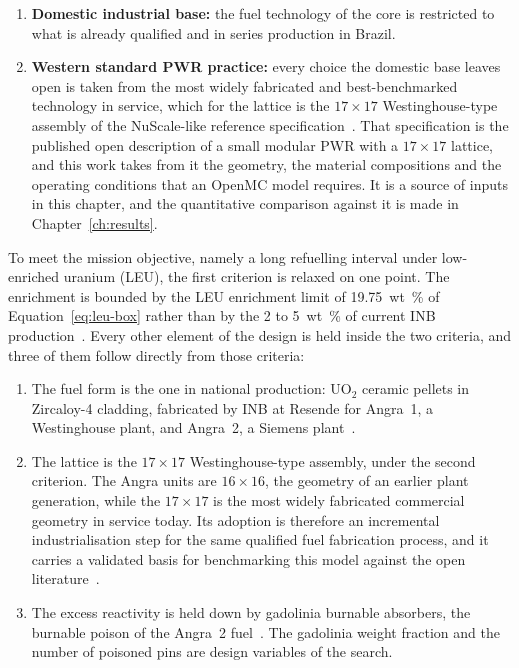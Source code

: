\begin{enumerate}
  \item \textbf{Domestic industrial base:} the fuel technology of the
        core is restricted to what is already qualified and in series
        production in Brazil.

  \item \textbf{Western standard PWR practice:} every choice the
        domestic base leaves open is taken from the most widely
        fabricated and best-benchmarked technology in service, which
        for the lattice is the $17\times17$ Westinghouse-type assembly
        of the NuScale-like reference
        specification~\cite{nuscale_htp2_2017,nuscale_like_core_2024}.
        That specification is the published open description of a small
        modular PWR with a $17\times17$ lattice,
        and this work takes from it the geometry, the material
        compositions and the operating conditions that an OpenMC model
        requires. It is a source of inputs in this chapter, and the
        quantitative comparison against it is made in
        Chapter~\ref{ch:results}.
\end{enumerate}

To meet the mission objective, namely a long refuelling interval under
low-enriched uranium (LEU), the first criterion is relaxed on one
point. The enrichment is bounded by the LEU enrichment limit of \SI{19.75}{wt\%} of
Equation~\eqref{eq:leu-box} rather than by the 2 to \SI{5}{wt\%} of
current INB production~\cite{inb_resende}. Every other element of the
design is held inside the two criteria, and three of them follow
directly from those criteria:

\begin{enumerate}
  \item The fuel form is the one in national production: UO$_2$
        ceramic pellets in Zircaloy-4 cladding, fabricated by INB at
        Resende for Angra~1, a Westinghouse plant, and Angra~2, a
        Siemens
        plant~\cite{inb_montagem_ec,eletronuclear_angra1,eletronuclear_angra2}.

  \item The lattice is the $17\times17$ Westinghouse-type assembly,
        under the second criterion. The Angra units are $16\times16$,
        the geometry of an earlier plant generation, while the
        $17\times17$ is the most widely fabricated commercial geometry
        in service today. Its adoption is therefore an incremental
        industrialisation step for the same qualified fuel fabrication
        process, and it carries a validated basis for benchmarking this
        model against the open
        literature~\cite{nuscale_htp2_2017,nuscale_like_core_2024}.

  \item The excess reactivity is held down by gadolinia burnable
        absorbers, the burnable poison of the Angra~2
        fuel~\cite{angra2_gd_2018}. The gadolinia weight fraction and
        the number of poisoned pins are design variables of the
        search.
\end{enumerate}

